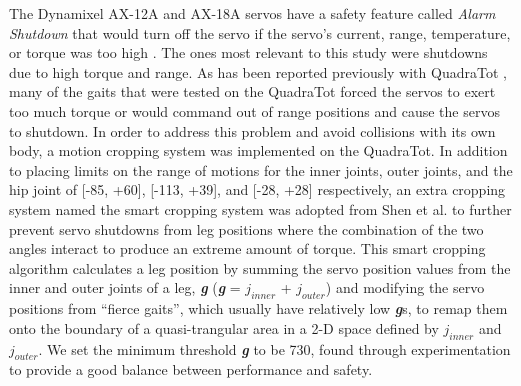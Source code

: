 The Dynamixel AX-12A and AX-18A servos have a safety feature called \emph{Alarm Shutdown} that would turn off the servo if the servo's current, range, temperature, or torque was too high \cite{robotis}. 
The ones most relevant to this study were shutdowns due to high torque and range. 
As has been reported previously with QuadraTot \cite{yos:clune}, many of the gaits that were tested on the QuadraTot forced the servos to exert too much torque or would command out of range positions and cause the servos to shutdown. In order to address this problem and avoid collisions with its own body, a motion cropping system was implemented on the QuadraTot. 
In addition to placing limits on the range of motions for the inner joints, outer joints, and the hip joint of [-85\degree, +60\degree], [-113\degree, +39\degree], and [-28\degree, +28\degree] respectively, an extra cropping system named the smart cropping system was adopted from Shen et al. \cite{haocheng} to further prevent servo shutdowns from leg positions where the combination of the two angles interact to produce an extreme amount of torque. This smart cropping algorithm calculates a leg position by summing the servo position values from the inner and outer joints of a leg, \emph{\textbf{g}} (\emph{\textbf{g}} = $j_{inner}$ + $j_{outer}$) %
and modifying the servo positions from ``fierce gaits'', which usually have relatively low \emph{\textbf{g}}s, to remap them onto the boundary of a quasi-trangular area in a 2-D space defined by $j_{inner}$ and $j_{outer}$. %
We set the minimum threshold \emph{\textbf{g}} to be 730, found through experimentation to provide a good balance between performance and safety. %


